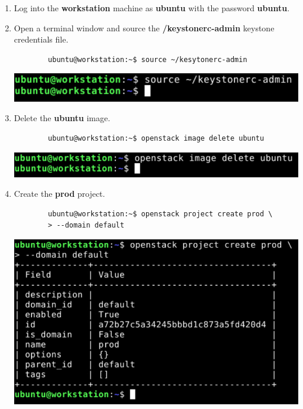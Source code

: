 \documentclass[letterpaper, 12pt]{article}
\begin{document}
\begin{enumerate}
    \item Log into the \textbf{workstation} machine as \textbf{ubuntu} with the password \textbf{ubuntu}.

    \item Open a terminal window and source the \textbf{\texttildemid/keystonerc-admin} keystone credentials file.
    \begin{lstlisting}
        ubuntu@workstation:~$ source ~/kesytonerc-admin
    \end{lstlisting}

    \begin{center}
        \includegraphics[width=\linewidth]{images/part1/step2.png}
    \end{center}

    \item Delete the \textbf{ubuntu} image.
    \begin{lstlisting}
        ubuntu@workstation:~$ openstack image delete ubuntu
    \end{lstlisting}

    \begin{center}
        \includegraphics[width=\linewidth]{images/part1/step3.png}
    \end{center}

    \item Create the \textbf{prod} project.
    \begin{lstlisting}
        ubuntu@workstation:~$ openstack project create prod \
        > --domain default
    \end{lstlisting}

    \begin{center}
        \includegraphics[width=\linewidth]{images/part1/step4.png}
    \end{center}


\end{enumerate}
\end{document}
